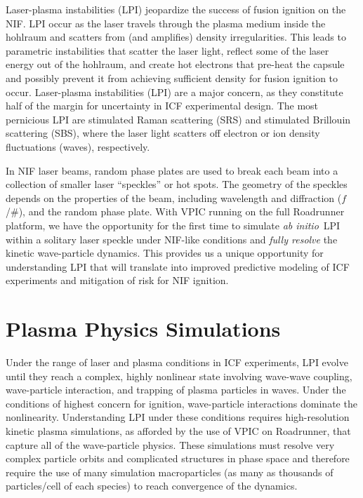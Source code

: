 \documentclass[letter,10pt]{article}
\newcommand{\abinitio} {\textit{ab initio}}
\begin{document}
Laser-plasma instabilities (LPI) jeopardize the success of fusion ignition on 
the NIF.  LPI occur as the laser travels through the plasma medium inside the hohlraum 
and scatters from (and amplifies) density irregularities.  This leads to 
parametric instabilities that scatter the laser light, reflect some of the laser 
energy out of the hohlraum, and create hot electrons that pre-heat the capsule 
and possibly prevent it from achieving sufficient density for fusion ignition 
to occur.  Laser-plasma instabilities (LPI) are a major concern, as they constitute 
half of the margin for uncertainty in ICF experimental design.\cite{}   The most 
pernicious LPI are stimulated Raman scattering (SRS) and stimulated Brillouin 
scattering (SBS), where the laser light scatters off electron or ion density 
fluctuations (waves), respectively.  

In NIF laser beams, random phase plates are used to break each beam into a collection 
of smaller laser ``speckles'' or hot spots.  The geometry of the speckles depends
on the properties of the beam, including wavelength and diffraction ($f$/\#), and the 
random phase plate.  With VPIC running on the full Roadrunner platform, we have the 
opportunity for the first time to simulate \abinitio\ LPI within a solitary laser 
speckle under NIF-like conditions and \textit{fully resolve} the kinetic 
wave-particle dynamics.  
This provides us a unique opportunity for understanding LPI 
that will translate into improved predictive modeling of ICF experiments and
mitigation of risk for NIF ignition. 

%
%
\section*{Plasma Physics Simulations}

Under the range of laser and plasma conditions in ICF experiments, LPI evolve until 
they reach a complex, highly nonlinear state involving wave-wave coupling, 
wave-particle interaction, and trapping of plasma particles in waves.  Under the 
conditions of highest concern for ignition, wave-particle interactions dominate the 
nonlinearity. 
Understanding LPI under these conditions requires high-resolution kinetic plasma 
simulations, as afforded by the use of VPIC on Roadrunner, that capture all of the
wave-particle physics.  These simulations must resolve very complex particle orbits and
complicated structures in phase space and therefore require the use of many simulation 
macroparticles (as many as thousands of particles/cell of each species) to reach 
convergence of the dynamics.~\cite{}  
\end{document}
